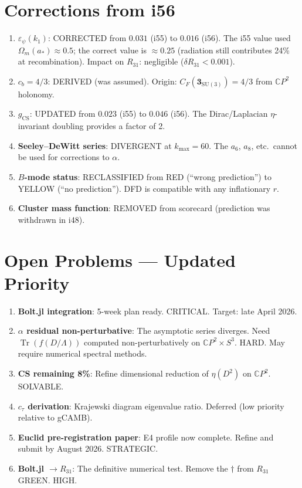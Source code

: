 \documentclass[11pt,a4paper]{article}
\newcommand{\Tr}{\operatorname{Tr}}
\newcommand{\CP}{\mathbb{C}P}
\begin{document}
\section{Corrections from i56}
\label{sec:corrections}

\begin{enumerate}
\item \textbf{$\varepsilon_\psi(k_1)$}: CORRECTED from $0.031$ (i55) to $0.016$ (i56). The i55 value used $\Omega_m(a_*) \approx 0.5$; the correct value is $\approx 0.25$ (radiation still contributes 24\% at recombination). Impact on $R_{31}$: negligible ($\delta R_{31} < 0.001$).
\item \textbf{$c_b = 4/3$}: DERIVED (was assumed). Origin: $C_F(\mathbf{3}_{\mathrm{SU}(3)}) = 4/3$ from $\CP^2$ holonomy.
\item \textbf{$g_{\mathrm{CS}}$}: UPDATED from $0.023$ (i55) to $0.046$ (i56). The Dirac/Laplacian $\eta$-invariant doubling provides a factor of 2.
\item \textbf{Seeley--DeWitt series}: DIVERGENT at $k_{\max} = 60$. The $a_6$, $a_8$, etc.\ cannot be used for corrections to $\alpha$.
\item \textbf{$B$-mode status}: RECLASSIFIED from RED (``wrong prediction'') to YELLOW (``no prediction''). DFD is compatible with any inflationary $r$.
\item \textbf{Cluster mass function}: REMOVED from scorecard (prediction was withdrawn in i48).
\end{enumerate}


\section{Open Problems --- Updated Priority}
\label{sec:open}

\begin{enumerate}[label=\textbf{P\arabic*.}]
\item \textbf{Bolt.jl integration}: 5-week plan ready. CRITICAL. Target: late April 2026.
\item \textbf{$\alpha$ residual non-perturbative}: The asymptotic series diverges. Need $\Tr(f(D/\Lambda))$ computed non-perturbatively on $\CP^2 \times S^3$. HARD. May require numerical spectral methods.
\item \textbf{CS remaining 8\%}: Refine dimensional reduction of $\eta(D^2)$ on $\CP^2$. SOLVABLE.
\item \textbf{$c_\tau$ derivation}: Krajewski diagram eigenvalue ratio. Deferred (low priority relative to gCAMB).
\item \textbf{Euclid pre-registration paper}: E4 profile now complete. Refine and submit by August 2026. STRATEGIC.
\item \textbf{Bolt.jl $\to R_{31}$}: The definitive numerical test. Remove the $\dagger$ from $R_{31}$ GREEN. HIGH.
\end{enumerate}
\end{document}
